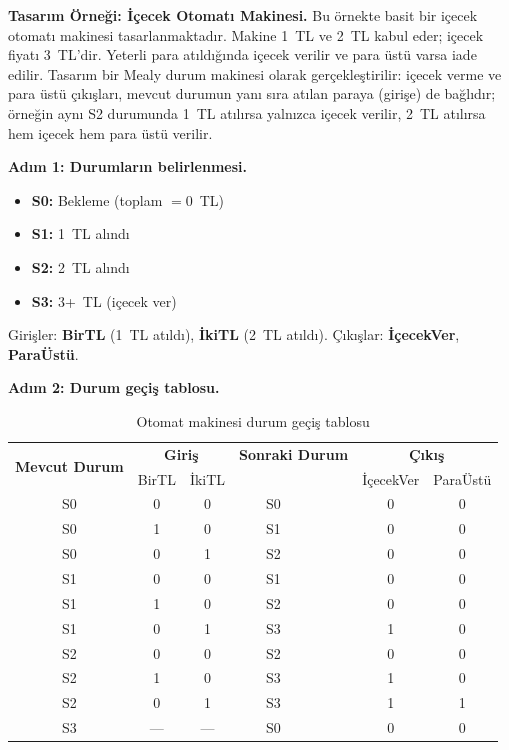 \begin{ornek}[B.16]
\textbf{Tasarım Örneği: İçecek Otomatı Makinesi.} Bu örnekte basit bir içecek otomatı makinesi tasarlanmaktadır. Makine 1~TL ve 2~TL kabul eder; içecek fiyatı 3~TL'dir. Yeterli para atıldığında içecek verilir ve para üstü varsa iade edilir. Tasarım bir Mealy durum makinesi olarak gerçekleştirilir: içecek verme ve para üstü çıkışları, mevcut durumun yanı sıra atılan paraya (girişe) de bağlıdır; örneğin aynı S2 durumunda 1~TL atılırsa yalnızca içecek verilir, 2~TL atılırsa hem içecek hem para üstü verilir.

\textbf{Adım 1: Durumların belirlenmesi.}

\begin{itemize}[nosep, leftmargin=2em]
    \item \textbf{S0:} Bekleme (toplam $= 0$~TL)
    \item \textbf{S1:} 1~TL alındı
    \item \textbf{S2:} 2~TL alındı
    \item \textbf{S3:} 3+~TL (içecek ver)
\end{itemize}

Girişler: \textbf{BirTL} (1~TL atıldı), \textbf{İkiTL} (2~TL atıldı).
Çıkışlar: \textbf{İçecekVer}, \textbf{ParaÜstü}.

\textbf{Adım 2: Durum geçiş tablosu.}

\begin{table}[H]
\centering
\caption*{Otomat makinesi durum geçiş tablosu}
\label{tab:B.otomat-gecis}
\small
\begin{tabular}{c|cc|cc|cc}
\toprule
\multirow{2}{*}{\textbf{Mevcut Durum}} &
\multicolumn{2}{c|}{\textbf{Giriş}} &
\multicolumn{2}{c|}{\textbf{Sonraki Durum}} &
\multicolumn{2}{c}{\textbf{Çıkış}} \\
 & BirTL & İkiTL & & & İçecekVer & ParaÜstü \\
\midrule
S0 & 0 & 0 & S0 & & 0 & 0 \\
S0 & 1 & 0 & S1 & & 0 & 0 \\
S0 & 0 & 1 & S2 & & 0 & 0 \\
S1 & 0 & 0 & S1 & & 0 & 0 \\
S1 & 1 & 0 & S2 & & 0 & 0 \\
S1 & 0 & 1 & S3 & & 1 & 0 \\
S2 & 0 & 0 & S2 & & 0 & 0 \\
S2 & 1 & 0 & S3 & & 1 & 0 \\
S2 & 0 & 1 & S3 & & 1 & 1 \\
S3 & --- & --- & S0 & & 0 & 0 \\
\bottomrule
\end{tabular}
\end{table}


\end{ornek}
